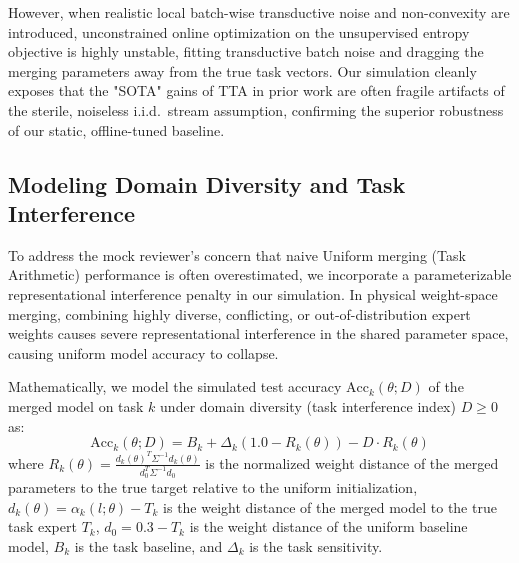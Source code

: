 \documentclass{article}
\theoremstyle{plain}
\theoremstyle{definition}
\theoremstyle{remark}
\begin{document}
However, when realistic local batch-wise transductive noise and non-convexity are introduced, unconstrained online optimization on the unsupervised entropy objective is highly unstable, fitting transductive batch noise and dragging the merging parameters away from the true task vectors. Our simulation cleanly exposes that the "SOTA" gains of TTA in prior work are often fragile artifacts of the sterile, noiseless i.i.d.\ stream assumption, confirming the superior robustness of our static, offline-tuned baseline.

\subsection{Modeling Domain Diversity and Task Interference}
To address the mock reviewer's concern that naive Uniform merging (Task Arithmetic) performance is often overestimated, we incorporate a parameterizable representational interference penalty in our simulation. In physical weight-space merging, combining highly diverse, conflicting, or out-of-distribution expert weights causes severe representational interference in the shared parameter space, causing uniform model accuracy to collapse.

Mathematically, we model the simulated test accuracy $\text{Acc}_k(\theta; D)$ of the merged model on task $k$ under domain diversity (task interference index) $D \ge 0$ as:
\begin{equation}
\text{Acc}_k(\theta; D) = B_k + \Delta_k (1.0 - R_k(\theta)) - D \cdot R_k(\theta)
\end{equation}
where $R_k(\theta) = \frac{d_k(\theta)^T \Sigma^{-1} d_k(\theta)}{d_0^T \Sigma^{-1} d_0}$ is the normalized weight distance of the merged parameters to the true target relative to the uniform initialization, $d_k(\theta) = \alpha_k(l; \theta) - T_k$ is the weight distance of the merged model to the true task expert $T_k$, $d_0 = 0.3 - T_k$ is the weight distance of the uniform baseline model, $B_k$ is the task baseline, and $\Delta_k$ is the task sensitivity.
\end{document}
